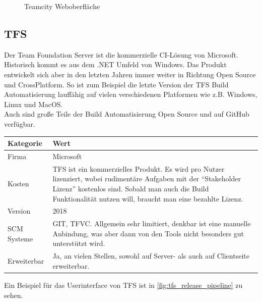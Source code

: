 \begin{figure}[H]
  \centering
  \caption{Teamcity Weboberfläche \cite{TeamCity-Marketing}}\label{fig:TC-continuous-integration}
\end{figure}

\subsection{TFS}
Der Team Foundation Server ist die kommerzielle CI-Lösung von Microsoft. Historisch kommt es aus dem .NET Umfeld von Windows. Das Produkt entwickelt sich aber in den letzten Jahren immer weiter in Richtung Open Source und CrossPlatform. So ist zum Beispiel die letzte Version der TFS Build Automatisierung lauffähig auf vielen verschiedenen Platformen wie z.B. Windows, Linux und MacOS.\\
Auch sind große Teile der Build Automatisierung Open Source und auf GitHub verfügbar.
\begin{center}
  \begin{tabularx}{\textwidth}{lX}
    \toprule
    Kategorie & Wert \\
    \midrule
    Firma &  Microsoft \\
		\addlinespace
    Kosten & TFS ist ein kommerzielles Produkt. Es wird pro Nutzer lizenziert, wobei rudimentäre Aufgaben mit der "`Stakeholder Lizenz"' kostenlos sind. Sobald man auch die Build Funktionalität nutzen will, braucht man eine bezahlte Lizenz.\\
		\addlinespace
		Version & 2018 \\
		\addlinespace
		SCM Systeme & GIT, TFVC. Allgemein sehr limitiert, denkbar ist eine manuelle Anbindung, was aber dann von den Tools nicht besonders gut unterstützt wird.\\
		\addlinespace
		Erweiterbar & Ja, an vielen Stellen, sowohl auf Server- als auch auf Clientseite erweiterbar.\\
    \bottomrule
  \end{tabularx}
\end{center}
Ein Beispiel für das Userinterface von TFS ist in \autoref{fig:tfs_release_pipeline} zu sehen. 

